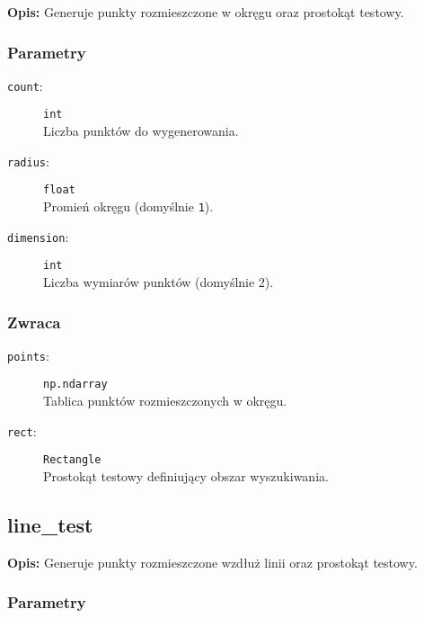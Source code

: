 \documentclass[12pt]{article}
\begin{document}
\textbf{Opis:} Generuje punkty rozmieszczone w okręgu oraz prostokąt testowy.

\subsubsection{Parametry}

\begin{description}
    \item[\texttt{count}:] \texttt{int} \\
    Liczba punktów do wygenerowania.
    
    \item[\texttt{radius}:] \texttt{float} \\
    Promień okręgu (domyślnie \texttt{1}).
    
    \item[\texttt{dimension}:] \texttt{int} \\
    Liczba wymiarów punktów (domyślnie 2).
\end{description}

\subsubsection{Zwraca}

\begin{description}
    \item[\texttt{points}:] \texttt{np.ndarray} \\
    Tablica punktów rozmieszczonych w okręgu.
    
    \item[\texttt{rect}:] \texttt{Rectangle} \\
    Prostokąt testowy definiujący obszar wyszukiwania.
\end{description}

\subsection{line\_test}

\textbf{Opis:} Generuje punkty rozmieszczone wzdłuż linii oraz prostokąt testowy.

\subsubsection{Parametry}
\end{document}
